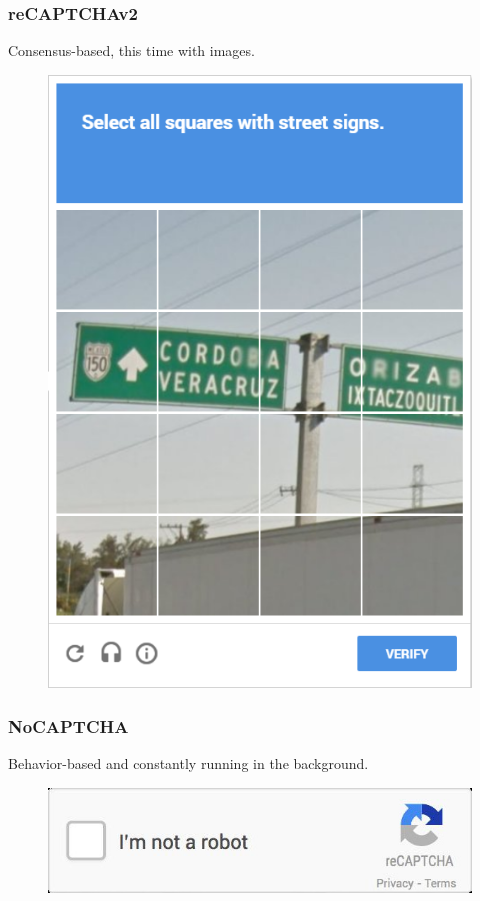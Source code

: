 \documentclass{beamer}
\begin{document}
\begin{frame}
	\frametitle{reCAPTCHAv2}
	Consensus-based, this time with images.
	\begin{figure}[h!t]
		\centering
		\includegraphics[scale=0.3]{assets/images/recaptchav2.png}
	\end{figure}

\end{frame}

\begin{frame}
	\frametitle{NoCAPTCHA}
	Behavior-based and constantly running in the background.
	\begin{figure}[h!t]
		\centering
		\includegraphics[scale=0.3]{assets/images/nocaptcha.jpg}
	\end{figure}

\end{frame}
\end{document}
